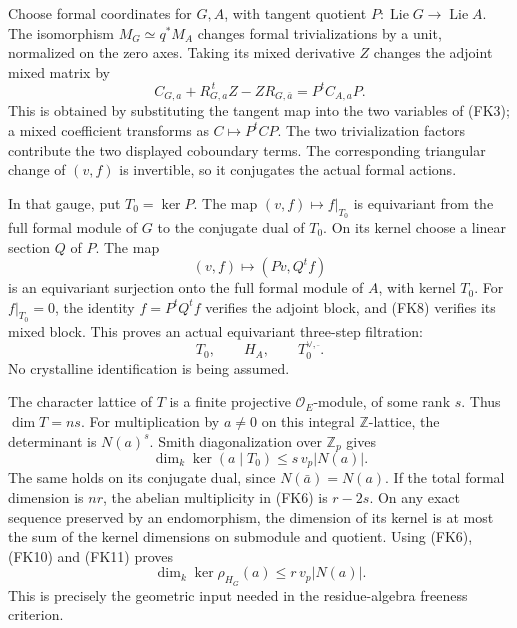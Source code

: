 Choose formal coordinates for \(G,A\), with tangent quotient
\(P:\operatorname{Lie}G\to\operatorname{Lie}A\).
The isomorphism \(M_G\simeq q^*M_A\) changes formal
trivializations by a unit, normalized on the zero axes.
Taking its mixed derivative \(Z\) changes the adjoint
mixed matrix by
\[
 C_{G,a}+R_{G,a}^{\,t}Z-ZR_{G,\bar a}
                                         =P^t C_{A,a}P .
 \tag{FK8}
\]
This is obtained by substituting the tangent map into the
two variables of (FK3); a mixed coefficient transforms as
\(C\mapsto P^tCP\).
The two trivialization factors contribute the two displayed
coboundary terms.
The corresponding triangular change of \((v,f)\) is invertible,
so it conjugates the actual formal actions.

In that gauge, put \(T_0=\ker P\).
The map \((v,f)\mapsto f|_{T_0}\) is equivariant from the full
formal module of \(G\) to the conjugate dual of \(T_0\).
On its kernel choose a linear section \(Q\) of \(P\).
The map
\[
                           (v,f)\longmapsto(Pv,Q^tf)
 \tag{FK9}
\]
is an equivariant surjection onto the full formal module
of \(A\), with kernel \(T_0\).
For \(f|_{T_0}=0\), the identity \(f=P^tQ^tf\) verifies
the adjoint block, and (FK8) verifies its mixed block.
This proves an actual equivariant three-step filtration:
\[
               T_0,\qquad H_A,\qquad T_0^{\vee,\bar{\ }} .
 \tag{FK10}
\]
No crystalline identification is being assumed.

The character lattice of \(T\) is a finite projective
\(\mathcal O_E\)-module, of some rank \(s\).
Thus \(\dim T=ns\).
For multiplication by \(a\ne0\) on this integral
\(\mathbb Z\)-lattice, the determinant is \(N(a)^s\).
Smith diagonalization over \(\mathbb Z_p\) gives
\[
             \dim_k\ker(a\mid T_0)
                     \le s\,v_p|N(a)| .
 \tag{FK11}
\]
The same holds on its conjugate dual, since \(N(\bar a)=N(a)\).
If the total formal dimension is \(nr\), the abelian
multiplicity in (FK6) is \(r-2s\).
On any exact sequence preserved by an endomorphism, the
dimension of its kernel is at most the sum of the
kernel dimensions on submodule and quotient.
Using (FK6), (FK10) and (FK11) proves
\[
                         \dim_k\ker\rho_{H_G}(a)
                               \le r\,v_p|N(a)|.
 \tag{FK12}
\]
This is precisely the geometric input needed in the
residue-algebra freeness criterion.

